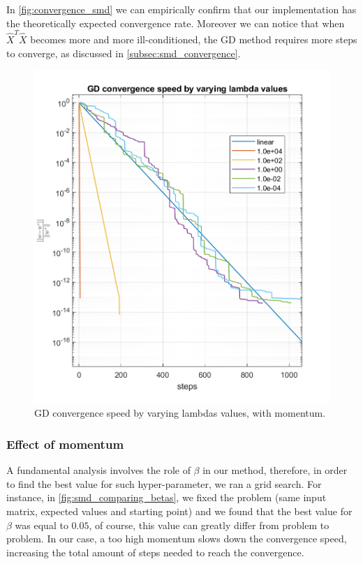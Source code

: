 \noindent In \autoref{fig:convergence_smd} we can empirically confirm that our implementation has the theoretically expected convergence rate. Moreover we can notice that when $\hat{X}^T\hat{X}$ becomes more and more ill-conditioned, the GD method requires more steps to converge, as discussed in \ref{subsec:smd_convergence}.

\begin{figure}[H]
    \centering
    \includegraphics[width = 0.7\linewidth]{images/smd/momentum_comparison_smd_linear_fixed.png}
    \caption{GD convergence speed by varying lambdas values, with momentum.}
    \label{fig:convergence_smd}
\end{figure}

\subsubsection{Effect of momentum}
A fundamental analysis involves the role of $\beta$ in our method, therefore,
in order to find the best value for such hyper-parameter, we ran a grid search. For instance, in \autoref{fig:smd_comparing_betas}, we fixed the problem (same input matrix, expected values and starting point) and we found that the best value for $\beta$ was equal to $0.05$, of course, this value can greatly differ from problem to problem. In our case, a too high momentum slows down the convergence speed, increasing the total amount of steps needed to reach the convergence.

